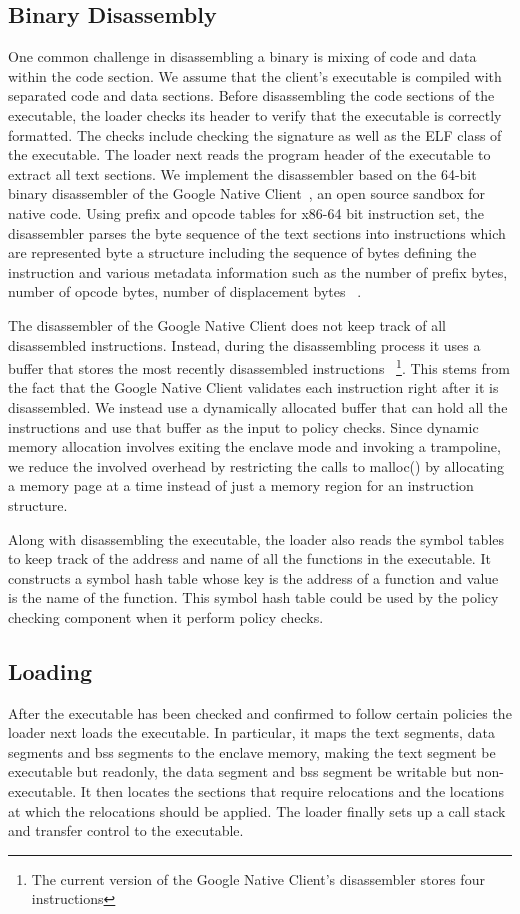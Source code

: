 \subsection{Binary Disassembly}
One common challenge in disassembling a binary is mixing of code and data within the code section. We assume that the client's executable is compiled with separated code and data sections. Before disassembling the code sections of the executable, the loader checks its header to verify that the executable is correctly formatted. The checks include checking the signature as well as the ELF class of the executable. The loader next reads the program header of the executable to extract all text sections. We implement the disassembler based on the 64-bit binary disassembler of the Google Native Client~\cite{Native Client}, 
an open source sandbox for native code. Using prefix and opcode tables for x86-64 bit instruction set, the disassembler parses the byte sequence of the text sections into instructions which are represented byte a structure including the sequence of bytes defining the instruction and various metadata information such as the number of prefix bytes, number of opcode bytes, number of displacement bytes ~\cite{Intel Instruction set manual}.

The disassembler of the Google Native Client does not keep track of all disassembled instructions. Instead, during the disassembling process it uses a buffer that stores the most recently disassembled instructions ~\footnote{The current version of the Google Native Client's disassembler stores four instructions}. This stems from the fact that the Google Native Client validates each instruction right after it is disassembled. We instead use a dynamically allocated buffer that can hold all the instructions and use that buffer as the input to policy checks. Since dynamic memory allocation involves exiting the enclave mode and invoking a trampoline, we reduce the involved overhead by restricting the calls to malloc() by allocating a memory page at a time instead of just a memory region for an instruction structure.

Along with disassembling the executable, the loader also reads the symbol tables to keep track of the address and
name of all the functions in the executable. It constructs a symbol hash table whose key is the address of a function
and value is the name of the function. This symbol hash table could be used by the policy checking component when it
perform policy checks.
\subsection{Loading}
After the executable has been checked and confirmed to follow certain policies the loader next loads the executable. In particular, it maps the text segments, data segments and bss segments to the enclave memory, making the text segment be executable but readonly, the data segment and bss segment be writable but non-executable. It then
locates the sections that require relocations and the locations at which the relocations should be applied. The loader finally sets up a call stack and transfer control to the executable.
